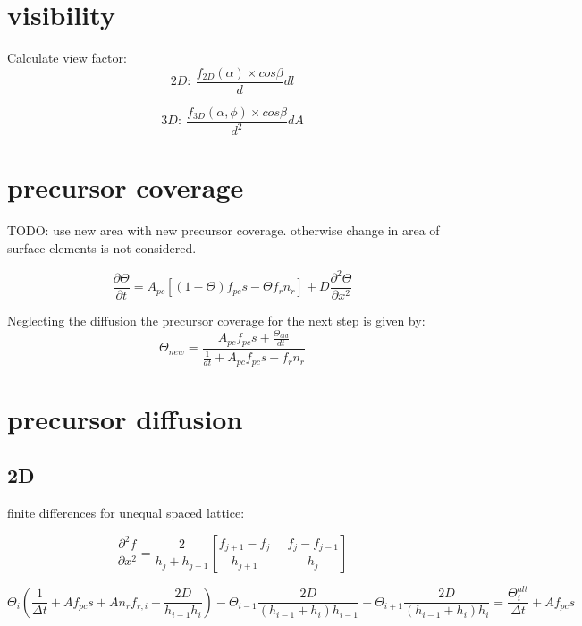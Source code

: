\section{visibility}
Calculate view factor:
\begin{equation}
2D:~\frac{f_{2D}(\alpha)\times cos\beta}{d} dl 
\end{equation}

\begin{equation}
3D:~\frac{f_{3D}(\alpha,\phi)\times cos\beta}{d^2} dA 
\end{equation}

\section{precursor coverage}
TODO: use new area with new precursor coverage. otherwise change in area of surface elements is not considered.

\begin{equation}
\frac{\partial\Theta}{\partial t} = A_{pc}[(1-\Theta)f_{pc}s-\Theta f_rn_r] + D\frac{\partial^2\Theta}{\partial x^2}
\end{equation}

Neglecting the diffusion the precursor coverage for the next step is given by:
\begin{equation}
\Theta_{new} = \frac{A_{pc} f_{pc} s + \frac{\Theta_{old}}{dt}}{\frac{1}{dt} + A_{pc} f_{pc} s + f_r n_r}
\end{equation}

\section{precursor diffusion}
\subsection{2D}
finite differences for unequal spaced lattice:

\begin{equation}
\frac{\partial^2 f}{\partial x^2} = \frac{2}{h_j + h_{j+1}}\left[\frac{f_{j+1} - f_j}{h_{j+1}} - \frac{f_j - f_{j-1}}{h_j}\right]
\end{equation}

\begin{equation}
\Theta_i\left(\frac{1}{\Delta t} + Af_{pc}s + An_rf_{r,i} + \frac{2D}{h_{i-1}h_i}\right) - \Theta_{i-1}\frac{2D}{(h_{i-1}+h_i)h_{i-1}} - \Theta_{i+1}\frac{2D}{(h_{i-1}+h_i)h_i} = \frac{\Theta_i^ {alt}}{\Delta t} + Af_{pc}s
\end{equation}

